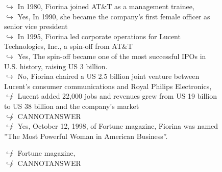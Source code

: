 \documentclass[11pt,a4paper, onecolumn]{article}
\begin{document}
\begin{figure}[t] \small \begin{tcolorbox}[boxsep=0pt,left=5pt,right=0pt,top=2pt,colback = yellow!5] \begin{dialogue}
 \small 
\colorbox{pink!25}{$\hookrightarrow$}
{ In 1980, Fiorina joined AT&T as a management trainee, }
\\
\colorbox{pink!25}{$\hookrightarrow$}
\colorbox{red!25}{Yes,}
{ In 1990, she became the company's first female officer as senior vice president }
\\
\colorbox{pink!25}{$\hookrightarrow$}
{ In 1995, Fiorina led corporate operations for Lucent Technologies, Inc., a spin-off from AT&T }
\\
\colorbox{pink!25}{$\hookrightarrow$}
\colorbox{red!25}{Yes,}
{ The spin-off became one of the most successful IPOs in U.S. history, raising US 3 billion. }
\\
\colorbox{pink!25}{$\hookrightarrow$}
\colorbox{red!25}{No,}
{ Fiorina chaired a US 2.5 billion joint venture between Lucent's consumer communications and Royal Philips Electronics, }
\\
\colorbox{pink!25}{$\not\hookrightarrow$}
{ Lucent added 22,000 jobs and revenues grew from US 19 billion to US 38 billion and the company's market }
\\
\colorbox{pink!25}{$\not\hookrightarrow$}
{ CANNOTANSWER }
\\
\colorbox{pink!25}{$\not\hookrightarrow$}
\colorbox{red!25}{Yes,}
{ October 12, 1998, of Fortune magazine, Fiorina was named ''The Most Powerful Woman in American Business''. }
 \end{dialogue}\end{tcolorbox}\end{figure}\begin{figure}[t] \small \begin{tcolorbox}[boxsep=0pt,left=5pt,right=0pt,top=2pt,colback = yellow!5] \begin{dialogue}
 \small 
\colorbox{pink!25}{$\not\hookrightarrow$}
{ Fortune magazine, }
\\
\colorbox{pink!25}{$\not\hookrightarrow$}
{ CANNOTANSWER }
\\
 \end{dialogue}\end{tcolorbox}\end{figure}
\end{document}
